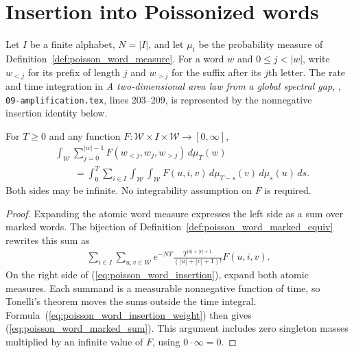 \section{Insertion into Poissonized words}
\label{sec:poisson_word_insertion}

Let $I$ be a finite alphabet, $N=|I|$, and let $\mu_t$ be the probability
measure of Definition~\ref{def:poisson_word_measure}.  For a word $w$ and
$0\le j<|w|$, write $w_{<j}$ for its prefix of length $j$ and $w_{>j}$
for the suffix after its $j$th letter.  The rate and time integration in
\emph{A two-dimensional area law from a global spectral gap},
\cite{OpenAI2026AreaLaw}, \texttt{09-amplification.tex}, lines 203--209,
is represented by the nonnegative insertion identity below.

\begin{theorem}
\label{thm:poisson_word_insertion}
\leanok
{}
For $T\ge0$ and any function
$F:\mathcal W\times I\times\mathcal W\to[0,\infty]$,
\begin{equation}
\label{eq:poisson_word_insertion}
\begin{aligned}
 &\int_{\mathcal W}\sum_{j=0}^{|w|-1}
   F(w_{<j},w_j,w_{>j})\,d\mu_T(w)\\
 &\qquad=\int_0^T\sum_{i\in I}
   \int_{\mathcal W}\int_{\mathcal W}
   F(u,i,v)\,d\mu_{T-s}(v)\,d\mu_s(u)\,ds.
\end{aligned}
\end{equation}
Both sides may be infinite.  No integrability assumption on $F$ is required.
\end{theorem}
\begin{proof}
\leanok
{}
Expanding the atomic word measure expresses the left side as a sum over
marked words.  The bijection of
Definition~\ref{def:poisson_word_marked_equiv} rewrites this sum as
\begin{align}
 \sum_{i\in I}\sum_{u,v\in\mathcal W}
 e^{-NT}\frac{T^{|u|+|v|+1}}{(|u|+|v|+1)!}F(u,i,v).
 \label{eq:poisson_word_marked_sum}
\end{align}
On the right side of (\ref{eq:poisson_word_insertion}), expand both atomic
measures.  Each summand is a measurable nonnegative function of time,
so Tonelli's theorem moves the sums outside the time integral.
Formula~(\ref{eq:poisson_word_insertion_weight}) then gives
(\ref{eq:poisson_word_marked_sum}).  This argument includes zero singleton
masses multiplied by an infinite value of $F$, using $0\cdot\infty=0$.
\end{proof}

